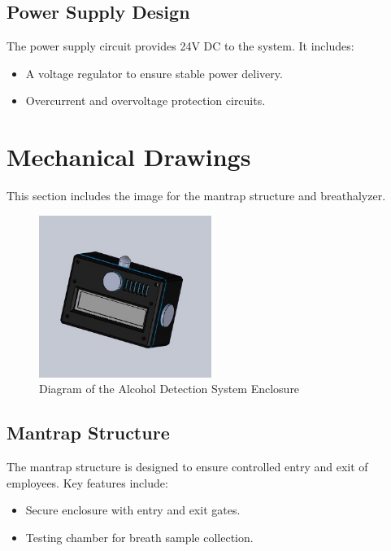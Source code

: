 \subsection{Power Supply Design}
The power supply circuit provides 24V DC to the system. It includes:
\begin{itemize}
    \item A voltage regulator to ensure stable power delivery.
    \item Overcurrent and overvoltage protection circuits.
\end{itemize}

\section{Mechanical Drawings}
\label{app:mechanical_drawings}

This section includes the image for the mantrap structure and breathalyzer.

\begin{figure}[H]
    \centering
    \includegraphics[width=0.5\textwidth]{images/assembly.JPG}
    \caption{Diagram of the Alcohol Detection System Enclosure}
    \label{fig:3d_diagram}
\end{figure}

\subsection{Mantrap Structure}
The mantrap structure is designed to ensure controlled entry and exit of employees. Key features include:
\begin{itemize}
    \item Secure enclosure with entry and exit gates.
    \item Testing chamber for breath sample collection.
\end{itemize}

